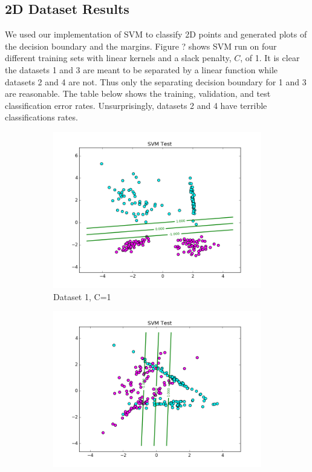 \documentclass[10pt,twoside]{article}
\begin{document}
\subsection{2D Dataset Results}

We used our implementation of SVM to classify 2D points and generated plots of the decision boundary and the margins. Figure ? shows SVM run on four different training sets with linear kernels and a slack penalty, $C$, of 1. It is clear the datasets 1 and 3 are meant to be separated by a linear function while datasets 2 and 4 are not. Thus only the separating decision boundary for 1 and 3 are reasonable. The table below shows the training, validation, and test classification error rates. Unsurprisingly, datasets 2 and 4 have terrible classifications rates.

\begin{figure}
        \begin{subfigure}[b]{0.25\textwidth}
                \centering
                \includegraphics[width=\linewidth]{Figures/P2/svm_data1_test_C1.png}
                \caption{Dataset 1, C=1}
        \end{subfigure}%
        \begin{subfigure}[b]{0.25\textwidth}
                \centering
                \includegraphics[width=\linewidth]{Figures/P2/svm_data2_test_C1.png}

\end{subfigure}
\end{figure}
\end{document}
